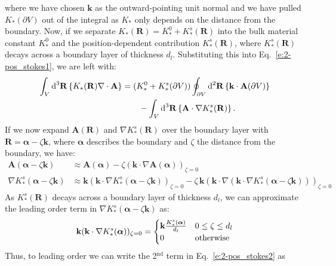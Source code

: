 where we have chosen $\mathbf{k}$ as the outward-pointing unit normal and we have pulled $K_*(\partial V)$ out of the integral as $K_*$ only depends on the distance from the boundary.
Now, if we separate $K_*(\mathbf{R}) = K_*^0 + K_*^s(\mathbf{R})$ into the bulk material constant $K_*^0$ and the position-dependent contribution $K_*^s(\mathbf{R})$, where $K_*^s(\mathbf{R})$ decays across a boundary layer of thickness $d_l$.
Substituting this into Eq.~\ref{e:2-pos_stokes1}, we are left with:
\begin{align}
  \int_{V}\textup{d}^3\mathbf{R} \left \{ K_{*} (\mathbf{R}) \nabla \cdot \mathbf{A} \right \} &=
  (K_*^0+K_*^s(\partial V)) \oint_{\partial V} \textup{d}^2\mathbf{R} \left \{ \mathbf{k} \cdot \mathbf{A}(\partial V)\right \} \nonumber \\&
  \quad \quad - \int_{V} \textup{d}^3\mathbf{R} \left \{ \mathbf{A} \cdot \nabla K_{*}^s (\mathbf{R}) \right \}. \label{e:2-pos_stokes2}
\end{align}
If we now expand $\mathbf{A}(\mathbf{R})$ and $\nabla K_*^s(\mathbf{R})$ over the boundary layer with $\mathbf{R} = \bm{\alpha} - \zeta \mathbf{k}$, where $\bm{\alpha}$ describes the boundary and $\zeta$ the distance from the boundary, we have:
\begin{align}
  \mathbf{A}(\bm{\alpha} - \zeta \mathbf{k}) &\approx \mathbf{A}(\bm{\alpha}) - \zeta (\mathbf{k} \cdot \nabla \mathbf{A}(\bm{\alpha}))_{\zeta = 0} \label{e:2-expandA} \\
  \nabla K_*^s(\bm{\alpha} - \zeta \mathbf{k}) &\approx \mathbf{k} (\mathbf{k} \cdot \nabla K_*^s(\bm{\alpha} - \zeta \mathbf{k}))_{\zeta = 0} - \zeta\, \mathbf{k}(\mathbf{k} \cdot \nabla (\mathbf{k} \cdot \nabla K_*^s(\bm{\alpha} - \zeta \mathbf{k})))_{\zeta = 0}
\end{align}
As $K_*^s(\mathbf{R})$ decays across a boundary layer of thickness $d_l$, we can approximate the leading order term in $\nabla K_*^s(\bm{\alpha} - \zeta \mathbf{k})$ as:
\begin{equation}
  \mathbf{k} (\mathbf{k} \cdot \nabla K_*^s(\bm{\alpha}))_{\zeta = 0} =
  \begin{cases}
    \mathbf{k}\frac{K_*^s(\bm{\alpha})}{d_l} & 0 \leq \zeta \leq d_l \\
    0 & \textup{otherwise}
  \end{cases}
\end{equation}
Thus, to leading order we can write the 2$^\textrm{nd}$ term in Eq.~\ref{e:2-pos_stokes2} as
